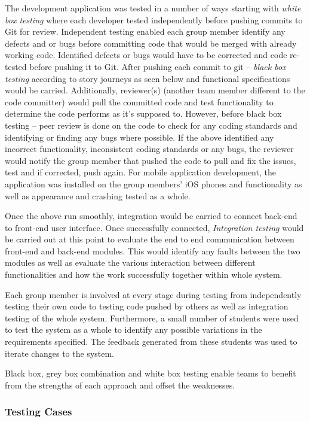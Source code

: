 \documentclass{article}
\begin{document}
The development application was tested in a number of ways starting with \emph{white box testing} where each developer tested independently before pushing commits to Git for review. Independent testing enabled each group member identify any defects and or bugs before committing code that would be merged with already working code. Identified defects or bugs would have to be corrected and code re-tested before pushing it to Git.
After pushing each commit to git – \emph{black box testing} according to story journeys as seen below and functional specifications would be carried. Additionally, reviewer(s) (another team member different to the code committer) would pull the committed code and test functionality to determine the code performs as it’s supposed to. However, before black box testing – peer review is done on the code to check for any coding standards and identifying or finding any bugs where possible. If the above identified any incorrect functionality, inconsistent coding standards or any bugs, the reviewer would notify the group member that pushed the code to pull and fix the issues, test and if corrected, push again. For mobile application development, the application was installed on the group members' iOS phones and functionality as well as appearance and crashing tested as a whole.

Once the above run smoothly, integration would be carried to connect back-end to front-end user interface. Once successfully connected, \emph{Integration testing} would be carried out at this point to evaluate the end to end communication between front-end and back-end modules. This would identify any faults between the two modules as well as evaluate the various interaction between different functionalities and how the work successfully together within whole system. 

Each group member is involved at every stage during testing from independently testing their own code to testing code pushed by others as well as integration testing of the whole system. Furthermore, a small number of students were used to test the system as a whole to identify any possible variations in the requirements specified. The feedback generated from these students was used to iterate changes to the system.

Black box, grey box combination and white box testing enable teams to benefit from the strengths of each approach and offset the weaknesses.

\subsubsection{Testing Cases}
\end{document}
